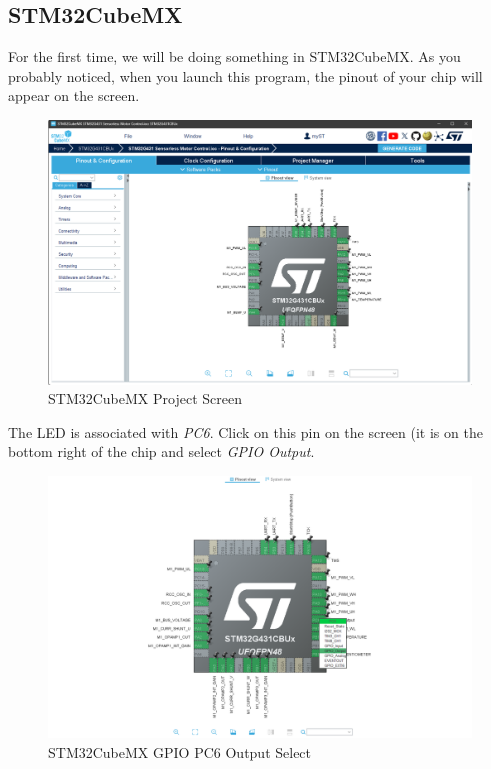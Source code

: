 \documentclass[10pt]{article}
\begin{document}
		\FloatBarrier \subsection{STM32CubeMX}
            For the first time, we will be doing something in STM32CubeMX. As you probably noticed, when you launch this program, the pinout of your chip will appear on the screen. 
            \begin{figure}[H]
                \centerline{\includegraphics[width=\textwidth]{References/CubeMX.png}}
                \caption{STM32CubeMX Project Screen}
            \end{figure}
            The LED is associated with \emph{PC6}. Click on this pin on the screen (it is on the bottom right of the chip and select \emph{GPIO Output}. 
            \begin{figure}[H]
                \centerline{\includegraphics[width=\textwidth]{References/CubeMX PC6 GPIO Out.png}}
                \caption{STM32CubeMX GPIO PC6 Output Select}
            \end{figure}
\end{document}
